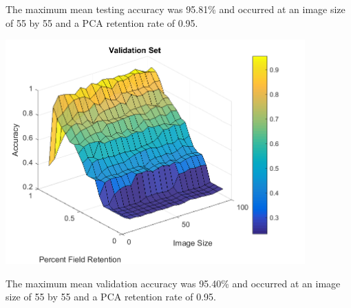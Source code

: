 \documentclass[12pt]{article}
\begin{document}
\begin{enumerate}
\begin{center}
    \label{fig:img_size_test}
  \end{center}
  The maximum mean testing accuracy was 95.81\% and occurred at an image size of 55 by 55 and a PCA retention rate of 0.95.\\
  \begin{center}
    \includegraphics[width=115mm]{./figs/num_fields_empirical_validation.png}
    \label{fig:img_size_valid}
  \end{center}
  The maximum mean validation accuracy was 95.40\% and occurred at an image size of 55 by 55 and a PCA retention rate of 0.95.\\


\end{enumerate}
\end{document}
